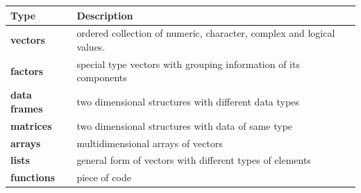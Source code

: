 \documentclass[a4paper]{book}
\begin{document}
\begin{longtable}[]{@{}ll@{}}
\toprule
\begin{minipage}[b]{0.09\columnwidth}\raggedright\strut
Type\strut
\end{minipage} & \begin{minipage}[b]{0.72\columnwidth}\raggedright\strut
Description\strut
\end{minipage}\tabularnewline
\midrule
\endhead
\begin{minipage}[t]{0.09\columnwidth}\raggedright\strut
\textbf{vectors}\strut
\end{minipage} & \begin{minipage}[t]{0.72\columnwidth}\raggedright\strut
ordered collection of numeric, character, complex and logical
values.\strut
\end{minipage}\tabularnewline
\begin{minipage}[t]{0.09\columnwidth}\raggedright\strut
\textbf{factors}\strut
\end{minipage} & \begin{minipage}[t]{0.72\columnwidth}\raggedright\strut
special type vectors with grouping information of its components\strut
\end{minipage}\tabularnewline
\begin{minipage}[t]{0.09\columnwidth}\raggedright\strut
\textbf{data frames}\strut
\end{minipage} & \begin{minipage}[t]{0.72\columnwidth}\raggedright\strut
two dimensional structures with different data types\strut
\end{minipage}\tabularnewline
\begin{minipage}[t]{0.09\columnwidth}\raggedright\strut
\textbf{matrices}\strut
\end{minipage} & \begin{minipage}[t]{0.72\columnwidth}\raggedright\strut
two dimensional structures with data of same type\strut
\end{minipage}\tabularnewline
\begin{minipage}[t]{0.09\columnwidth}\raggedright\strut
\textbf{arrays}\strut
\end{minipage} & \begin{minipage}[t]{0.72\columnwidth}\raggedright\strut
multidimensional arrays of vectors\strut
\end{minipage}\tabularnewline
\begin{minipage}[t]{0.09\columnwidth}\raggedright\strut
\textbf{lists}\strut
\end{minipage} & \begin{minipage}[t]{0.72\columnwidth}\raggedright\strut
general form of vectors with different types of elements\strut
\end{minipage}\tabularnewline
\begin{minipage}[t]{0.09\columnwidth}\raggedright\strut
\textbf{functions}\strut
\end{minipage} & \begin{minipage}[t]{0.72\columnwidth}\raggedright\strut
piece of code\strut
\end{minipage}\tabularnewline
\bottomrule
\end{longtable}
\end{document}
